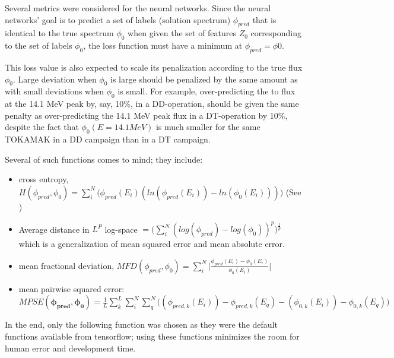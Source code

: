 \documentclass[a4paper, 12pt]{article}
\newcommand{\ve}[1]{\boldsymbol{#1}}
\begin{document}
    Several metrics were considered for the neural networks. Since the neural networks' goal is to predict a set of labels (solution spectrum) $\phi_{pred}$ that is identical to the true spectrum $\phi_{0}$ when given the set of features $Z_{0}$ corresponding to the set of labels $\phi_{0}$, the loss function must have a minimum at $\phi_{pred}=\phi{0}$.

    This loss value is also expected to scale its penalization according to the true flux $\phi_{0}$. Large deviation when $\phi_0$ is large should be penalized by the same amount as with small deviations when $\phi_{0}$ is small. For example, over-predicting the to flux at the 14.1 MeV peak by, say, 10\%, in a DD-operation, should be given the same penalty as over-predicting the 14.1 MeV peak flux in a DT-operation by 10\%, despite the fact that $\phi_{0}(E=14.1 MeV)$ is much smaller for the same TOKAMAK in a DD campaign than in a DT campaign.

    Several of such functions comes to mind; they include:

    \begin{itemize}
        \item cross entropy, $H(\phi_{pred}, \phi_{0}) = \sum_i^N \bigg(\phi_{pred}(E_i)(ln(\phi_{pred}(E_i)) - ln(\phi_{0}(E_i)))\bigg)$ (See \cite{Johnson-Shore-Deriv})
        \item Average distance in $L^P$ log-space $=\bigg(\sum_i^N(log(\phi_{pred})-log(\phi_{0}))^p\bigg)^{\frac{1}{p}}$
        which is a generalization of mean squared error and mean absolute error.
        \item mean fractional deviation, $MFD (\phi_{pred}, \phi_{0}) = \sum_i^N \bigg|\frac{\phi_{pred}(E_i)-\phi_0(E_i)}{\phi_{0}(E_i)}\bigg|$
        \item mean pairwise squared error:\\
            $MPSE(\ve{\phi_{pred}}, \ve{\phi_{0}}) = \frac{1}{L} \sum_{k}^L \sum_i^N \sum_q^N \bigg( \left(\phi_{pred,k}(E_i)\right)-\phi_{pred,k}(E_q)-\left(\phi_{0,k}(E_i)\right)-\phi_{0,k}(E_q) \bigg)$
    \end{itemize}

    In the end, only the following function was chosen as they were the default functions available from tensorflow; using these functions minimizes the room for human error and development time.
\end{document}
